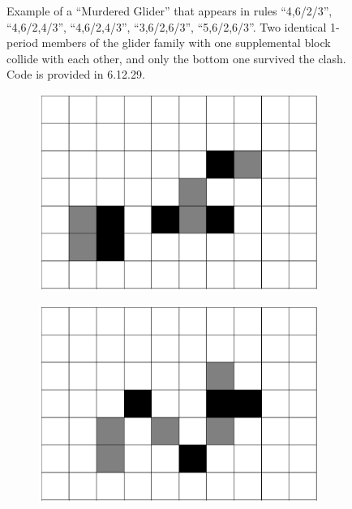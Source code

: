 \documentclass[12pt]{article}
\numberwithin{figure}{section} %
\begin{document}
\begin{figure}[H]
\begin{subfigure}{0.23\textwidth}
     	\subcaption{}
   	\end{subfigure}
   \caption{Example of a “Murdered Glider” that appears in rules “4,6/2/3”, “4,6/2,4/3”, “4,6/2,4/3”, “3,6/2,6/3”, “5,6/2,6/3”. Two identical 1-period members of the glider family with one supplemental block collide with each other, and only the bottom one survived the clash. Code is provided in 6.12.29. }
\end{figure}

\begin{figure}[htbp]
	\begin{subfigure}{0.23\textwidth}
     	\centering
     	\includegraphics[width=\linewidth]{Section4/33.0}
     	\subcaption{}
   	\end{subfigure}
    	\begin{subfigure}{0.23\textwidth}
     	\centering
     	\includegraphics[width=\linewidth]{Section4/33.1}

\end{subfigure}
\end{figure}
\end{document}
